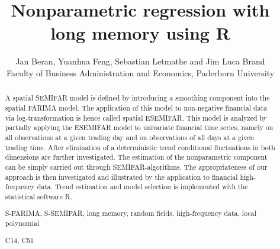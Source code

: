 \documentclass[12pt]{article}
\begin{document}
\title{Nonparametric regression with long memory using R}
\author{Jan Beran, Yuanhua Feng, Sebastian Letmathe and Jim Luca Brand\\ Faculty of Business Administration and Economics,
Paderborn University}
\maketitle


\begin{abstract}

\noindent 
 A  spatial SEMIFAR model is defined by introducing a smoothing component into the spatial FARIMA model. The application of this model to non-negative financial data via log-transformation is hence called spatial ESEMIFAR. This model is analyzed by partially applying the ESEMIFAR model to univariate financial time series, namely on all observations at a given trading day and on observations of all days at a given trading time. After elimination of a deterministic trend conditional fluctuations in both dimensions are further investigated. The estimation of the nonparametric component can be simply carried out through SEMIFAR-algorithms. The appropriateness of our approach is then investigated and illustrated by the application to financial high-frequency data. Trend estimation and model selection is implemented with the statistical software R. 
 
\vspace{.3cm}

  S-FARIMA, S-SEMIFAR, long memory, random fields, high-frequency data, local polynomial


\vspace{.3cm}

 C14, C51
\end{abstract}
\newpage
\end{document}
